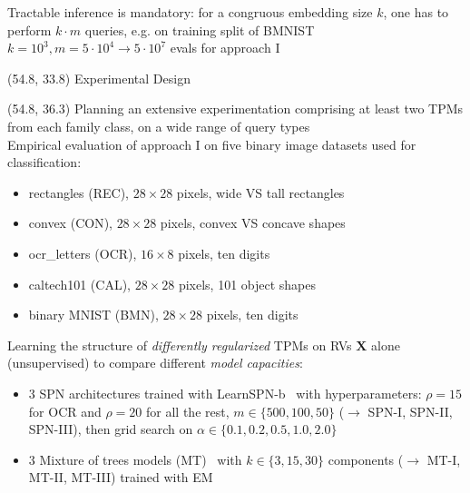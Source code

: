 \documentclass[final]{beamer}
\begin{document}
\begin{frame}{}
\begin{textblock}{25.2}
  Tractable inference is mandatory:
  for a congruous embedding size $k$, one has to perform $k\cdot
    m$ queries, e.g. on training split of BMNIST $k=10^{3},m=5\cdot
    10^{4}\rightarrow 5\cdot 10^{7}$ evals for approach I
  
  \end{textblock}



  \begin{textblock}{20}(54.8, 33.8)
    Experimental Design
  \end{textblock}

  \begin{textblock}{25.2}(54.8, 36.3)
    \small
    Planning an extensive experimentation comprising at least two TPMs
    from each family class, on a wide range of query types\\[20pt]
    
    Empirical evaluation of approach I on five binary image datasets
    used for classification:
    \begin{itemize}
    \item rectangles (\textsf{REC}), $28\times 28$ pixels, wide VS
      tall rectangles
    \item convex (\textsf{CON}), $28\times 28$ pixels, convex VS
      concave shapes
    \item ocr\_letters (\textsf{OCR}), $16\times 8$ pixels, ten digits
    \item caltech101 (\textsf{CAL}), $28\times 28$ pixels, 101 object shapes
    \item binary MNIST (\textsf{BMN}), $28\times 28$ pixels, ten
      digits
    \end{itemize}\vspace{15pt}
    
    Learning the structure of \emph{differently regularized} TPMs on RVs
    $\mathbf{X}$ alone (unsupervised) to compare different \emph{model capacities}:
    \begin{itemize}
    \item 3 SPN architectures trained with
      \textsf{LearnSPN-b}~\parencite{Vergari2015} with
      hyperparameters: $\rho=15$ for \textsf{OCR}
      and $\rho=20$ for all the rest, $m\in\{500,
      100, 50\}$  ($\rightarrow$ \textsf{SPN-I}, \textsf{SPN-II},
      \textsf{SPN-III}), then grid search on $\alpha\in\{0.1, 0.2,
      0.5, 1.0, 2.0\}$
    \item 3 Mixture of trees models (MT)~\parencite{Meila2000} with $k\in\{3,15,30\}$
      components ($\rightarrow$ \textsf{MT-I}, \textsf{MT-II},
      \textsf{MT-III}) trained with EM
    \end{itemize}\vspace{15pt}
    

\end{textblock}
\end{frame}
\end{document}
